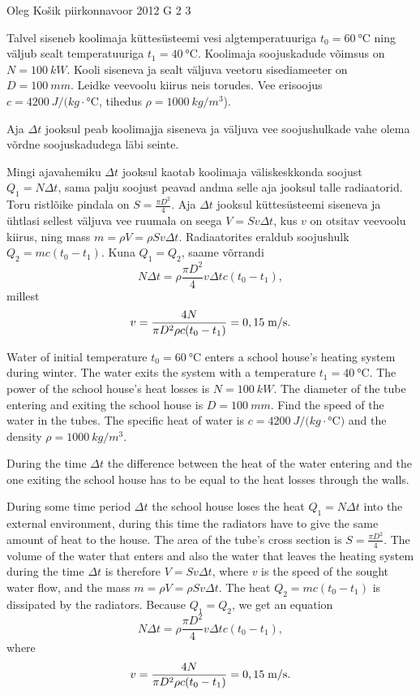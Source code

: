 {Oleg Košik} %
{piirkonnavoor} %
{2012} %
{G 2} %
{3} %
{
\ifStatement
Talvel siseneb koolimaja küttesüsteemi vesi algtemperatuuriga $t_0=\SI{60}{\celsius}$
ning väljub sealt temperatuuriga $t_1=\SI{40}{\celsius}$. Koolimaja soojuskadude
võimsus on $N=\SI{100}{kW}$. Kooli siseneva ja sealt väljuva veetoru sisediameeter on
$D=\SI{100}{mm}$. Leidke veevoolu kiirus neis torudes. Vee erisoojus
$c=\SI{4200}{J/(kg\cdot\celsius}$, tihedus $\rho=\SI{1000}{kg/m^3}$).
\fi


\ifHint
Aja $\Delta t$ jooksul peab koolimajja siseneva ja väljuva vee soojushulkade vahe olema võrdne soojuskadudega läbi seinte.
\fi


\ifSolution
Mingi ajavahemiku $\Delta t$ jooksul kaotab koolimaja väliskeskkonda soojust $Q_1=N\Delta t$, sama palju soojust peavad andma selle aja jooksul talle radiaatorid. Toru ristlõike pindala on $S=\frac{\pi D^2}{4}$. Aja $\Delta t$ jooksul küttesüsteemi siseneva ja ühtlasi sellest väljuva vee ruumala on seega $V=Sv\Delta t$, kus $v$ on otsitav veevoolu kiirus, ning mass $m=\rho V=\rho Sv\Delta t$. Radiaatorites eraldub soojushulk $Q_2=mc(t_0-t_1)$. Kuna $Q_1=Q_2$, saame võrrandi
\[
N\Delta t=\rho \frac{\pi D^2}{4}v\Delta t c (t_0-t_1),
\]
millest
\[
v=\frac{4N}{\pi D^2\rho c (t_0-t_1)}=0,15\;\hbox{m/s}.
\]
\fi


\ifEngStatement
Water of initial temperature $t_0=\SI{60}{\celsius}$ enters a school house’s heating system during winter. The water exits the system with a temperature $t_1=\SI{40}{\celsius}$. The power of the school house’s heat losses is $N=\SI{100}{kW}$. The diameter of the tube entering and exiting the school house is $D=\SI{100}{mm}$. Find the speed of the water in the tubes. The specific heat of water is $c=\SI{4200}{J/(kg\cdot\celsius)}$ and the density $\rho=\SI{1000}{kg/m^3}$.
\fi


\ifEngHint
During the time $\Delta t$ the difference between the heat of the water entering and the one exiting the school house has to be equal to the heat losses through the walls.
\fi


\ifEngSolution
During some time period $\Delta t$ the school house loses the heat $Q_1=N\Delta t$ into the external environment, during this time the radiators have to give the same amount of heat to the house. The area of the tube's cross section is $S=\frac{\pi D^2}{4}$. The volume of the water that enters and also the water that leaves the heating system during the time $\Delta t$ is therefore $V=Sv\Delta t$, where $v$ is the speed of the sought water flow, and the mass $m=\rho V=\rho Sv\Delta t$. The heat $Q_2=mc(t_0-t_1)$ is dissipated by the radiators. Because $Q_1=Q_2$, we get an equation
\[
N\Delta t=\rho \frac{\pi D^2}{4}v\Delta t c (t_0-t_1),
\] 
where 
\[
v=\frac{4N}{\pi D^2\rho c (t_0-t_1)}=0,15\;\hbox{m/s}.
\]
\fi
}